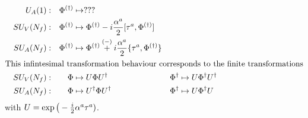 \begin{subequations}
\begin{align}
         &  & U_A(1): &  & \Phi^{(\dagger)} & \mapsto ??? &        &                                  \\
         &  & SU_V(N_f): &  & \Phi^{(\dagger)} & \mapsto \Phi^{(\dagger)}-{i}\frac{\alpha^a}{2}[\tau^a,\Phi^{(\dagger)}]                                                              \\
         &  & SU_A(N_f): &  & \Phi^{(\dagger)} & \mapsto \Phi^{(\dagger)}\overset{(-)}{+}{i}\frac{\alpha^a}{2}\{\tau^a,\Phi^{(\dagger)}\} &        &                                  \\
        \intertext{This infintesimal transformation behaviour corresponds to the finite transformations}
         &  & SU_V(N_f): &  & \Phi & \mapsto U\Phi U^\dagger                                                          &        \Phi^{\dagger} & \mapsto U\Phi^{\dagger}U^\dagger                                  \\
         &  & SU_A(N_f): &  & \Phi             & \mapsto U^\dagger\Phi U^\dagger&\Phi^\dagger&\mapsto U\Phi^\dagger U                 &                                              
    \end{align}
\end{subequations}
with $U=\exp\big(-\frac{{i}}{2}\alpha^a\tau^a)$.


